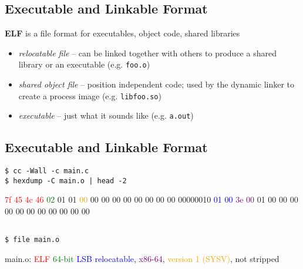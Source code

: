 \documentclass[xga]{xdvislides}
\begin{document}
\subsection{Executable and Linkable Format}

{\bf ELF} is a file format for executables, object code, shared libraries

\begin{itemize}
	\item {\em relocatable file} -- can be linked
		together with others to produce a
		shared library or an executable (e.g. \verb+foo.o+)
	\item {\em shared object file} -- position
		independent code; used by the dynamic
		linker to create a process image (e.g. \verb+libfoo.so+)
	\item {\em executable} -- just what it sounds like (e.g. \verb+a.out+)
\end{itemize}

\subsection{Executable and Linkable Format}
\begin{verbatim}
$ cc -Wall -c main.c
$ hexdump -C main.o | head -2
\end{verbatim}
  \textcolor{red}{7f 45 4c 46} \textcolor{green}{02} 01 01 \textcolor{orange}{00}  00 00 00 00 00 00 00 00
00000010  \textcolor{blue}{01 00} \textcolor{purple}{3e 00} 01 00 00 00  00 00 00 00 00 00 00 00
\begin{verbatim}

$ file main.o
\end{verbatim}
main.o: \textcolor{red}{ELF} \textcolor{green}{64-bit} \textcolor{blue}{LSB relocatable}, \textcolor{purple}{x86-64}, \textcolor{orange}{version 1 (SYSV)}, not stripped
\setfontphv
\end{document}
